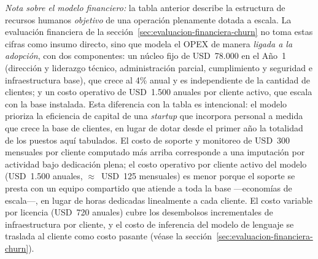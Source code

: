 \noindent\textit{Nota sobre el modelo financiero:} la tabla anterior describe la estructura de recursos humanos \emph{objetivo} de una operación plenamente dotada a escala. La evaluación financiera de la sección~\ref{sec:evaluacion-financiera-churn} no toma estas cifras como insumo directo, sino que modela el OPEX de manera \emph{ligada a la adopción}, con dos componentes: un núcleo fijo de USD~78.000 en el Año~1 (dirección y liderazgo técnico, administración parcial, cumplimiento y seguridad e infraestructura base), que crece al 4\% anual y es independiente de la cantidad de clientes; y un costo operativo de USD~1.500 anuales por cliente activo, que escala con la base instalada. Esta diferencia con la tabla es intencional: el modelo prioriza la eficiencia de capital de una \textit{startup} que incorpora personal a medida que crece la base de clientes, en lugar de dotar desde el primer año la totalidad de los puestos aquí tabulados. El costo de soporte y monitoreo de USD~300 mensuales por cliente computado más arriba corresponde a una imputación por actividad bajo dedicación plena; el costo operativo por cliente activo del modelo (USD~1.500 anuales, $\approx$~USD~125 mensuales) es menor porque el soporte se presta con un equipo compartido que atiende a toda la base —economías de escala—, en lugar de horas dedicadas linealmente a cada cliente. El costo variable por licencia (USD~720 anuales) cubre los desembolsos incrementales de infraestructura por cliente, y el costo de inferencia del modelo de lenguaje se traslada al cliente como costo pasante (véase la sección~\ref{sec:evaluacion-financiera-churn}).
	
